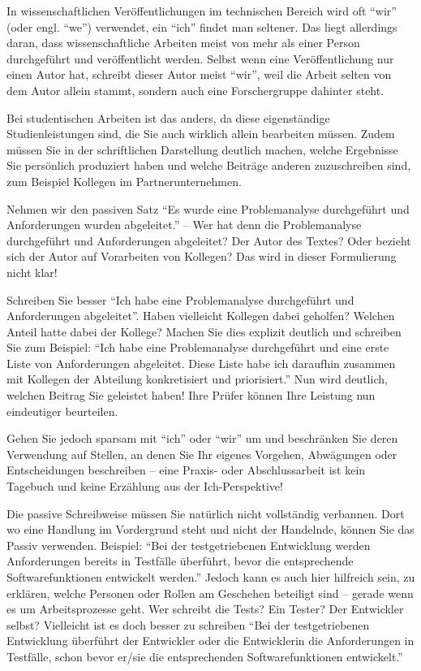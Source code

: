 In wissenschaftlichen Veröffentlichungen im technischen Bereich wird oft \enquote{wir} (oder engl. \enquote{we}) verwendet, ein \enquote{ich} findet man seltener. Das liegt allerdings daran, dass wissenschaftliche Arbeiten meist von mehr als einer Person durchgeführt und veröffentlicht werden. Selbst wenn eine Veröffentlichung nur einen Autor hat, schreibt dieser Autor meist \enquote{wir}, weil die Arbeit selten von dem Autor allein stammt, sondern auch eine Forschergruppe dahinter steht.

Bei studentischen Arbeiten ist das anders, da diese eigenständige Studienleistungen sind, die Sie auch wirklich allein bearbeiten müssen. Zudem müssen Sie in der schriftlichen Darstellung deutlich machen, welche Ergebnisse Sie persönlich produziert haben und welche Beiträge anderen zuzuschreiben sind, zum Beispiel Kollegen im Partnerunternehmen.

Nehmen wir den passiven Satz \enquote{Es wurde eine Problemanalyse durchgeführt und Anforderungen wurden abgeleitet.} -- Wer hat denn die Problemanalyse durchgeführt und Anforderungen abgeleitet? Der Autor des Textes? Oder bezieht sich der Autor auf Vorarbeiten von Kollegen? Das wird in dieser Formulierung nicht klar! 

Schreiben Sie besser \enquote{Ich habe eine Problemanalyse durchgeführt und Anforderungen abgeleitet}. Haben vielleicht Kollegen dabei geholfen? Welchen Anteil hatte dabei der Kollege? Machen Sie dies explizit deutlich und schreiben Sie zum Beispiel: \enquote{Ich habe eine Problemanalyse durchgeführt und eine erste Liste von Anforderungen abgeleitet. Diese Liste habe ich daraufhin zusammen mit Kollegen der Abteilung konkretisiert und priorisiert.} Nun wird deutlich, welchen Beitrag Sie geleistet haben! Ihre Prüfer können Ihre Leistung nun eindeutiger beurteilen.

Gehen Sie jedoch sparsam mit \enquote{ich} oder \enquote{wir} um und beschränken Sie deren Verwendung auf Stellen, an denen Sie Ihr eigenes Vorgehen, Abwägungen oder Entscheidungen beschreiben -- eine Praxis- oder Abschlussarbeit ist kein Tagebuch und keine Erzählung aus der Ich-Perspektive!

Die passive Schreibweise müssen Sie natürlich nicht vollständig verbannen. Dort wo eine Handlung im Vordergrund steht und nicht der Handelnde, können Sie das Passiv verwenden. Beispiel: \enquote{Bei der testgetriebenen Entwicklung werden Anforderungen bereits in Testfälle überführt, bevor die entsprechende Softwarefunktionen entwickelt werden.} Jedoch kann es auch hier hilfreich sein, zu erklären, welche Personen oder Rollen am Geschehen beteiligt sind -- gerade wenn es um Arbeitsprozesse geht. Wer schreibt die Tests? Ein Tester? Der Entwickler selbst? Vielleicht ist es doch besser zu schreiben \enquote{Bei der testgetriebenen Entwicklung überführt der Entwickler oder die Entwicklerin die Anforderungen in Testfälle, schon bevor er/sie die entsprechenden Softwarefunktionen entwickelt.}


